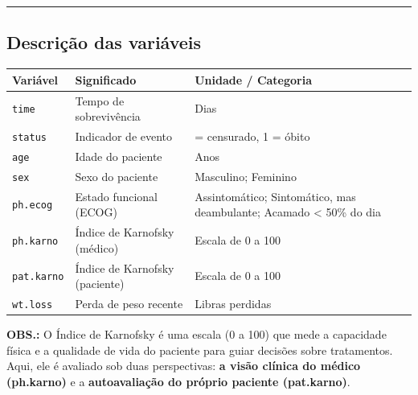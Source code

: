 \documentclass[
  brazilian,
  letterpaper,
  DIV=11,
  numbers=noendperiod]{scrartcl}
\newcounter{none} %
\begin{document}
\begin{center}\rule{0.5\linewidth}{0.5pt}\end{center}

\subsection{\texorpdfstring{\textbf{Descrição das
variáveis}}{Descrição das variáveis}}\label{descriuxe7uxe3o-das-variuxe1veis}

{\def\LTcaptype{none} %
\begin{longtable}[]{@{}
  >{\raggedright\arraybackslash}p{}
  >{\raggedright\arraybackslash}p{}
  >{\raggedright\arraybackslash}p{}@{}}
\toprule\noalign{}
\begin{minipage}[b]{\linewidth}\raggedright
Variável
\end{minipage} & \begin{minipage}[b]{\linewidth}\raggedright
Significado
\end{minipage} & \begin{minipage}[b]{\linewidth}\raggedright
Unidade / Categoria
\end{minipage} \\
\midrule\noalign{}
\endhead
\bottomrule\noalign{}
\endlastfoot
\texttt{time} & Tempo de sobrevivência & Dias \\
\texttt{status} & Indicador de evento & 0 = censurado, 1 = óbito \\
\texttt{age} & Idade do paciente & Anos \\
\texttt{sex} & Sexo do paciente & Masculino; Feminino \\
\texttt{ph.ecog} & Estado funcional (ECOG) & Assintomático; Sintomático,
mas deambulante; Acamado \textless{} 50\% do dia \\
\texttt{ph.karno} & Índice de Karnofsky (médico) & Escala de 0 a 100 \\
\texttt{pat.karno} & Índice de Karnofsky (paciente) & Escala de 0 a
100 \\
\texttt{wt.loss} & Perda de peso recente & Libras perdidas \\
\end{longtable}
}

{\textbf{OBS.:} O Índice de Karnofsky é uma escala (0 a 100) que mede a
capacidade física e a qualidade de vida do paciente para guiar decisões
sobre tratamentos. Aqui, ele é avaliado sob duas perspectivas: \textbf{a
visão clínica do médico (ph.karno)} e a \textbf{autoavaliação do próprio
paciente (pat.karno)}.}
\end{document}
